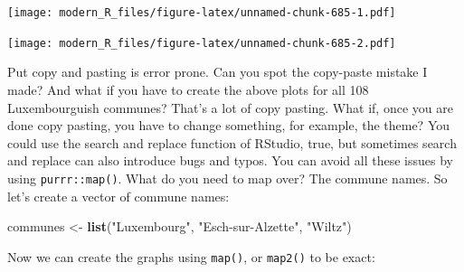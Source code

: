 \documentclass[]{gitbook}
\newenvironment{Shaded}{\begin{snugshade}}{\end{snugshade}}
\newcommand{\DataTypeTok}[1]{\textcolor[rgb]{0.13,0.29,0.53}{#1}}
\newcommand{\KeywordTok}[1]{\textcolor[rgb]{0.13,0.29,0.53}{\textbf{#1}}}
\newcommand{\NormalTok}[1]{#1}
\newcommand{\OperatorTok}[1]{\textcolor[rgb]{0.81,0.36,0.00}{\textbf{#1}}}
\newcommand{\StringTok}[1]{\textcolor[rgb]{0.31,0.60,0.02}{#1}}
\begin{document}
\texttt{[image: modern\_R\_files/figure-latex/unnamed-chunk-685-1.pdf]}

\begin{Shaded}
\end{Shaded}

\texttt{[image: modern\_R\_files/figure-latex/unnamed-chunk-685-2.pdf]}

Put copy and pasting is error prone. Can you spot the copy-paste mistake I made? And what if you
have to create the above plots for all 108 Luxembourguish communes? That's a lot of copy pasting.
What if, once you are done copy pasting, you have to change something, for example, the theme? You
could use the search and replace function of RStudio, true, but sometimes search and replace can
also introduce bugs and typos. You can avoid all these issues by using \texttt{purrr::map()}. What do you
need to map over? The commune names. So let's create a vector of commune names:

\begin{Shaded}
\begin{Highlighting}[]
\NormalTok{communes <-}\StringTok{ }\KeywordTok{list}\NormalTok{(}\StringTok{"Luxembourg"}\NormalTok{, }\StringTok{"Esch-sur-Alzette"}\NormalTok{, }\StringTok{"Wiltz"}\NormalTok{)}
\end{Highlighting}
\end{Shaded}

Now we can create the graphs using \texttt{map()}, or \texttt{map2()} to be exact:
\end{document}
